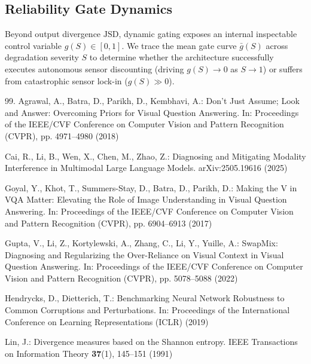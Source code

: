 \documentclass[graybox]{svmult}
\newcommand{\jsd}{\text{JSD}}
\begin{document}
\subsection{Reliability Gate Dynamics}
Beyond output divergence $\jsd$, dynamic gating exposes an internal inspectable control variable $g(S) \in [0, 1]$. We trace the mean gate curve $\bar{g}(S)$ across degradation severity $S$ to determine whether the architecture successfully executes autonomous sensor discounting (driving $g(S) \to 0$ as $S \to 1$) or suffers from catastrophic sensor lock-in ($g(S) \gg 0$).

\begin{thebibliography}{99.}
Agrawal, A., Batra, D., Parikh, D., Kembhavi, A.: Don't Just Assume; Look and Answer: Overcoming Priors for Visual Question Answering. In: Proceedings of the IEEE/CVF Conference on Computer Vision and Pattern Recognition (CVPR), pp. 4971--4980 (2018)

Cai, R., Li, B., Wen, X., Chen, M., Zhao, Z.: Diagnosing and Mitigating Modality Interference in Multimodal Large Language Models. arXiv:2505.19616 (2025)

Goyal, Y., Khot, T., Summers-Stay, D., Batra, D., Parikh, D.: Making the {V} in {VQA} Matter: Elevating the Role of Image Understanding in Visual Question Answering. In: Proceedings of the IEEE/CVF Conference on Computer Vision and Pattern Recognition (CVPR), pp. 6904--6913 (2017)

Gupta, V., Li, Z., Kortylewski, A., Zhang, C., Li, Y., Yuille, A.: {SwapMix}: Diagnosing and Regularizing the Over-Reliance on Visual Context in Visual Question Answering. In: Proceedings of the IEEE/CVF Conference on Computer Vision and Pattern Recognition (CVPR), pp. 5078--5088 (2022)

Hendrycks, D., Dietterich, T.: Benchmarking Neural Network Robustness to Common Corruptions and Perturbations. In: Proceedings of the International Conference on Learning Representations (ICLR) (2019)

Lin, J.: Divergence measures based on the {Shannon} entropy. IEEE Transactions on Information Theory \textbf{37}(1), 145--151 (1991)


\end{thebibliography}
\end{document}
